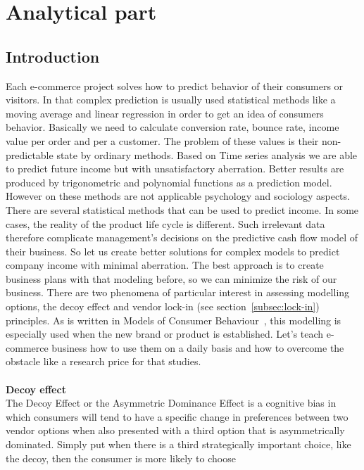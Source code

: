 
\chapter{Analytical part} \label{sec:analytical}

\section{Introduction} \label{sec:introduction}
Each e-commerce project solves how to predict behavior of their consumers or visitors.
In that complex prediction is usually used statistical methods like a moving average and linear regression in order to
get an idea of consumers behavior.
Basically we need to calculate conversion rate, bounce rate, income value per order and per a customer.
The problem of these values is their non-predictable state by ordinary methods.
Based on Time series analysis we are able to predict
future income but with unsatisfactory aberration.
Better results are produced by trigonometric and polynomial functions as a prediction model.
However on these methods are not applicable psychology and sociology aspects.
There are several statistical methods that can be used to predict income.
In some cases, the reality of the product life cycle is different.
Such irrelevant data therefore complicate management's decisions on the predictive cash flow model of their business.
So let us create better solutions for complex models to predict company income with minimal aberration.
The best approach is to create business plans with that modeling before, so we can minimize the risk of our business.
There are  two phenomena of particular interest in assessing modelling options,  the decoy effect and vendor lock-in (see section~\ref{subsec:lock-in}) principles.
As is written in Models of Consumer Behaviour~\cite{patel}, this modelling is especially used when the new brand or product is established.
Let's teach e-commerce business how to use them on a daily basis and how to overcome the obstacle like a research price for that studies.\\
\\
\textbf{Decoy effect} \label{subsec:decoy}\\
The Decoy Effect or the Asymmetric Dominance Effect is a cognitive bias in which consumers will tend to have a specific
change in preferences between two vendor options when also presented with a third option that is asymmetrically dominated.
Simply put when there is a third strategically important choice, like the decoy, then the consumer is more likely to choose

